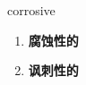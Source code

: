 
\begin{frame}
{\huge corrosive}
\begin{center}
\begin{enumerate}\Large
  \item \textbf{腐蚀性的}
  \item \textbf{讽刺性的}
\end{enumerate}
\end{center}
\end{frame}

